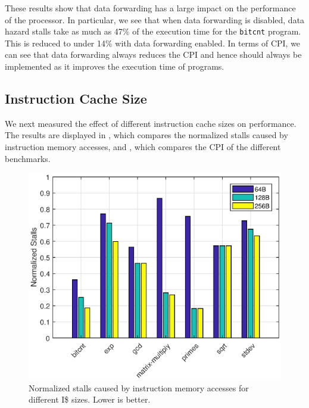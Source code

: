 \documentclass[conference,hidelinks]{IEEEtran}
\begin{document}
These results show that data forwarding has a large impact on the performance of the processor. In particular, we see that when data forwarding is disabled, data hazard stalls take as much as 47\% of the execution time for the \texttt{bitcnt} program. This is reduced to under 14\% with data forwarding enabled. In terms of CPI, we can see that data forwarding always reduces the CPI and hence should always be implemented as it improves the execution time of programs.

\subsection{Instruction Cache Size}

We next measured the effect of different instruction cache sizes on performance. The results are displayed in , which compares the normalized stalls caused by instruction memory accesses, and , which compares the CPI of the different benchmarks.

\begin{figure}[!htb]
  \centering
  \includegraphics[width=0.8\columnwidth]{plots/instruction_cache_stalls.eps}
  \caption{Normalized stalls caused by instruction memory accesses for different I\$ sizes. Lower is better.}
  \label{fig:instruction_cache_stalls}
\end{figure}
\end{document}
